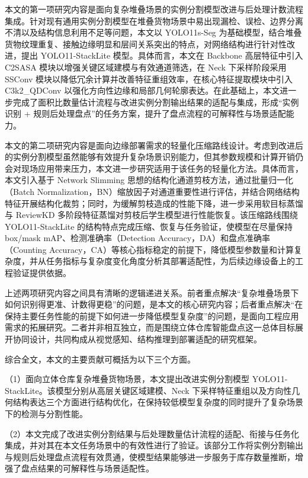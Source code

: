 本文的第一项研究内容是面向复杂堆叠场景的实例分割模型改进与后处理计数流程集成。针对现有通用实例分割模型在堆叠货物场景中易出现漏检、误检、边界分离不清以及结构信息利用不足等问题，本文以 YOLO11s-Seg 为基础模型，结合堆叠货物纹理重复、接触边缘明显和层间关系突出的特点，对网络结构进行针对性改进，提出 YOLO11-StackLite 模型。具体而言，本文在 Backbone 高层特征中引入 C2SASA 模块以增强关键区域建模与有效通道筛选，在 Neck 下采样阶段采用 SSConv 模块以降低冗余计算并改善特征重组效率，在核心特征提取模块中引入 C3k2\_QDConv 以强化方向性边缘和局部几何轮廓表达。在此基础上，本文进一步完成了面积比数量估计流程与改进实例分割输出结果的适配与集成，形成“实例识别 + 规则后处理盘点”的任务方案，提升了盘点流程的可解释性与场景适配能力。

本文的第二项研究内容是面向边缘部署需求的轻量化压缩路线设计。考虑到改进后的实例分割模型虽然能够有效提升复杂场景识别能力，但其参数规模和计算开销仍会对现场应用带来压力，本文进一步研究适用于该任务的轻量化方法。具体而言，本文引入基于 Network Slimming 思想的结构化通道剪枝方法，通过批量归一化（Batch Normalization，BN）缩放因子对通道重要性进行评估，并结合网络结构特征开展结构化裁剪；同时，为缓解剪枝造成的性能下降，进一步采用软目标蒸馏与 ReviewKD 多阶段特征蒸馏对剪枝后学生模型进行性能恢复。该压缩路线围绕 YOLO11-StackLite 的结构特点完成压缩、恢复与任务验证，使模型在尽量保持 box/mask mAP、检测准确率（Detection Accuracy，DA）和盘点准确率（Counting Accuracy，CA）等核心指标稳定的前提下，降低模型参数量和计算复杂度，并从任务指标与复杂度变化角度分析其部署适配性，为后续边缘设备上的工程验证提供依据。

上述两项研究内容之间具有清晰的逻辑递进关系。前者重点解决“复杂堆叠场景下如何识别得更准、计数得更稳”的问题，是本文的核心研究内容；后者重点解决“在保持主要任务性能的前提下如何进一步降低模型复杂度”的问题，是面向工程应用需求的拓展研究。二者并非相互独立，而是围绕立体仓库智能盘点这一总体目标展开协同设计，共同构成从视觉感知、结构推理到部署适配的研究框架。

综合全文，本文的主要贡献可概括为以下三个方面。

\par\noindent
（1）面向立体仓库复杂堆叠货物场景，本文提出改进实例分割模型 YOLO11-StackLite。该模型分别从高层关键区域建模、Neck 下采样特征重组以及方向性几何结构表达三个方面进行结构优化，在保持较低模型复杂度的同时提升了复杂场景下的检测与分割性能。

\par\noindent
（2）本文完成了改进实例分割结果与后处理数量估计流程的适配、衔接与任务化集成，并对其在本文任务场景中的有效性进行了验证。该部分工作将实例分割输出与规则后处理盘点流程有效贯通，使模型结果能够进一步服务于库存数量推断，增强了盘点结果的可解释性与场景适配性。

